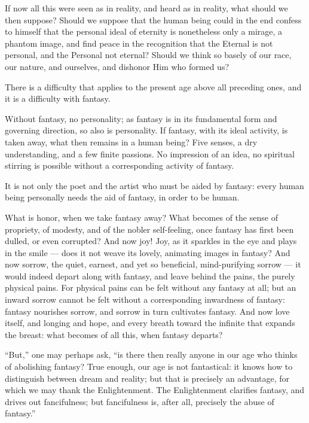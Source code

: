 \documentclass[12pt,a4paper]{book}
\begin{document}
If now all this were seen as in reality, and heard as in reality, what should we then suppose? Should we suppose that the human being could in the end confess to himself that the personal ideal of eternity is nonetheless only a mirage, a phantom image, and find peace in the recognition that the Eternal is not personal, and the Personal not eternal? Should we think so basely of our race, our nature, and ourselves, and dishonor Him who formed us?

There is a difficulty that applies to the present age above all preceding ones, and it is a difficulty with fantasy.

Without fantasy, no personality; as fantasy is in its fundamental form and governing direction, so also is personality. If fantasy, with its ideal activity, is taken away, what then remains in a human being? Five senses, a
dry understanding, and a few finite passions. No impression of an idea, no spiritual stirring is possible without a corresponding activity of fantasy.

It is not only the poet and the artist who must be aided by fantasy: every human being personally needs the aid of fantasy, in order to be human.

What is honor, when we take fantasy away? What becomes of the sense of propriety, of modesty, and of the nobler self-feeling, once fantasy has first been dulled, or even corrupted? And now joy! Joy, as it sparkles in the eye and plays in the smile --- does it not weave its lovely, animating images in fantasy? And now sorrow, the quiet, earnest, and yet so beneficial, mind-purifying sorrow --- it would indeed depart along with fantasy, and leave behind the pains, the purely physical pains. For physical pains can be felt without any fantasy at all; but an inward sorrow cannot be felt without a corresponding inwardness of fantasy: fantasy nourishes sorrow, and sorrow in turn cultivates fantasy. And now love itself, and longing and hope, and every breath toward the infinite that expands the breast: what becomes of all this, when fantasy departs?

``But,'' one may perhaps ask, ``is there then really anyone in our age who thinks of abolishing fantasy? True enough, our age is not fantastical: it knows how to distinguish between dream and reality; but that is precisely an advantage, for which we may thank the Enlightenment. The Enlightenment clarifies fantasy, and drives out fancifulness; but fancifulness is, after all, precisely the abuse of fantasy.''
\end{document}
